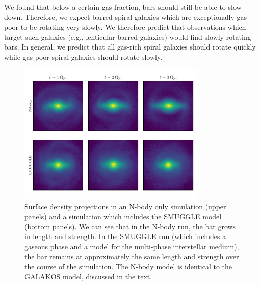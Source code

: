 \documentclass{natureprintstyle}
\begin{document}
We found that below a certain gas fraction, bars should still be able to slow
down. Therefore, we expect barred spiral galaxies which are exceptionally
gas-poor to be rotating very slowly. We therefore predict that observations
which target such galaxies (e.g., lenticular barred
galaxies\cite{2009ARAA..47..159B}) would find slowly rotating bars. In
general, we predict that all gas-rich spiral galaxies should rotate quickly
while gas-poor spiral galaxies should rotate slowly.

\begin{figure}[h]%
\centering
\includegraphics[width=0.8\textwidth]{fig/fig1.pdf}
\caption{Surface density projections in an N-body only simulation (upper
panels) and a simulation which includes the SMUGGLE model (bottom panels). We
can see that in the N-body run, the bar grows in length and strength. In the
SMUGGLE run (which includes a gaseous phase and a model for the multi-phase
interstellar medium), the bar remains at approximately the same length and
strength over the course of the simulation. The N-body model is identical to
the GALAKOS model, discussed in the text.}\label{fig:overview}
\end{figure}
\end{document}
